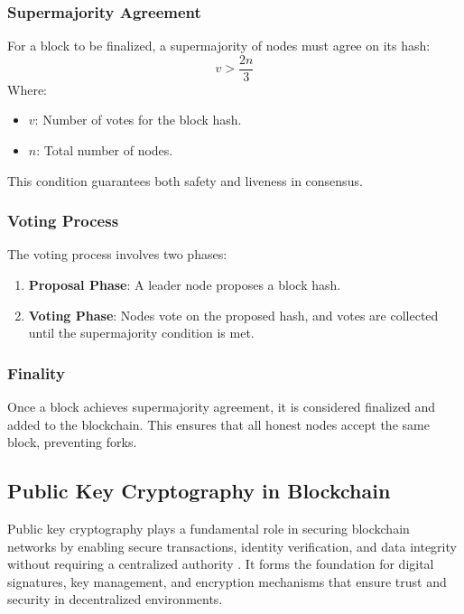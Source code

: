 \documentclass{article}
\begin{document}
\subsubsection{Supermajority Agreement}
For a block to be finalized, a supermajority of nodes must agree on its hash:
\[
    v > \frac{2n}{3}
\]
Where:
\begin{itemize}
    \item \( v \): Number of votes for the block hash.
    \item \( n \): Total number of nodes.
\end{itemize}

This condition guarantees both safety and liveness in consensus.

\subsubsection{Voting Process}

The voting process involves two phases:
\begin{enumerate}
    \item \textbf{Proposal Phase}: A leader node proposes a block hash.
    \item \textbf{Voting Phase}: Nodes vote on the proposed hash, and votes are collected until the supermajority condition is met.
\end{enumerate}

\subsubsection{Finality}
Once a block achieves supermajority agreement, it is considered finalized and added to the blockchain. This ensures that all honest nodes accept the same block, preventing forks.

\subsection{Public Key Cryptography in Blockchain}

Public key cryptography plays a fundamental role in securing blockchain networks by enabling secure transactions, identity verification, and data integrity without requiring a centralized authority \cite{narayanan2016bitcoin}. It forms the foundation for digital signatures, key management, and encryption mechanisms that ensure trust and security in decentralized environments.
\end{document}
